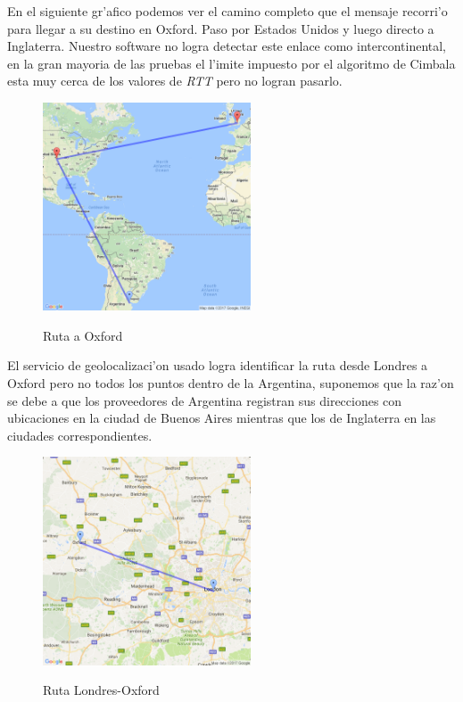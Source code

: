 En el siguiente gr'afico podemos ver el camino completo que el mensaje recorri'o para llegar a su destino en Oxford. Paso por Estados Unidos y luego directo a 
Inglaterra. Nuestro software no logra detectar este enlace como intercontinental, en la gran mayoria de las pruebas el l'imite impuesto por el algoritmo de
Cimbala esta muy cerca de los valores de \textit{RTT} pero no logran pasarlo.
\begin{figure}[H]
\centering
\caption{Ruta a Oxford}
\includegraphics[width=0.55\textwidth]{modules/oxford_path_1}
 \label{fig:ruta_oxford_1}
\end{figure}

El servicio de geolocalizaci'on usado logra identificar la ruta desde Londres a Oxford pero no todos los puntos dentro de la Argentina, suponemos que la raz'on se
debe a que los proveedores de Argentina registran sus direcciones con ubicaciones en la ciudad de Buenos Aires mientras que los de Inglaterra en las ciudades
correspondientes.
\begin{figure}[H]
\centering
\caption{Ruta Londres-Oxford}
\includegraphics[width=0.55\textwidth]{modules/oxford_path_2}
 \label{fig:ruta_oxford_2}
\end{figure}
